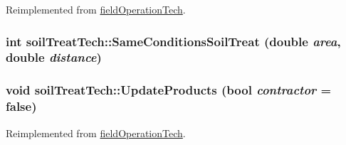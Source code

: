 Reimplemented from \hyperlink{classfield_operation_tech_a2a2c416f3f3fe8ceb2f1f1b63c149a09}{fieldOperationTech}.\hypertarget{classsoil_treat_tech_a77cc5c86d535e4982c10ca67ecedb28a}{
\subsubsection[{SameConditionsSoilTreat}]{\setlength{\rightskip}{0pt plus 5cm}int soilTreatTech::SameConditionsSoilTreat (double {\em area}, \/  double {\em distance})}}
\label{classsoil_treat_tech_a77cc5c86d535e4982c10ca67ecedb28a}
\hypertarget{classsoil_treat_tech_aea3565eebbd55354cbee50d13c1c892a}{
\subsubsection[{UpdateProducts}]{\setlength{\rightskip}{0pt plus 5cm}void soilTreatTech::UpdateProducts (bool {\em contractor} = {\ttfamily false})}}
\label{classsoil_treat_tech_aea3565eebbd55354cbee50d13c1c892a}


Reimplemented from \hyperlink{classfield_operation_tech_ab0b2bf71efca78b637837fc4d0e3a9d4}{fieldOperationTech}.

